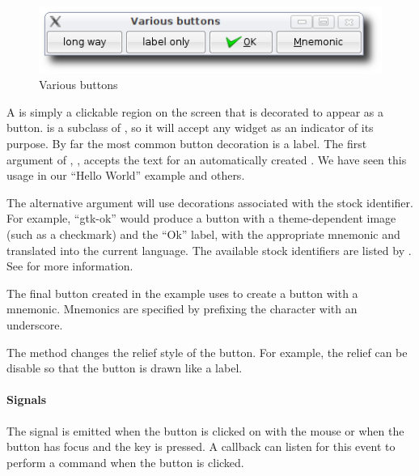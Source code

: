 \begin{figure}
  \centering
  \includegraphics[width=.8\textwidth]{RGtk2-various-button}
  \caption{Various buttons}
  \label{fig:RGtk2:various-buttons}
\end{figure}

A  is simply a clickable region on the screen that is
decorated to appear as a button.  is a subclass of
, so it will accept any widget as an indicator of its
purpose. By far the most common button decoration is a label. The
first argument of ,
, accepts the text for an automatically
created . We have seen this usage in our ``Hello
World'' example and others.

The alternative  argument will use
decorations associated with the stock identifier. For example,
``gtk-ok'' would produce a button with a theme-dependent image (such
as a checkmark) and the ``Ok'' label, with the appropriate mnemonic
and translated into the current language.  The available stock
identifiers are listed by . See
 for more information.

The final button created in the example uses
 to create a button with a
mnemonic. Mnemonics are specified by prefixing the character with an
underscore.

The method  changes the relief style of
the button. For example, the relief can be disable so that the button
is drawn like a label.

\paragraph{Signals}

The  signal is emitted when the button is
clicked on with the mouse or when the button has focus and the
 key is pressed. A callback can listen for this event to
perform a command when the button is clicked.  

